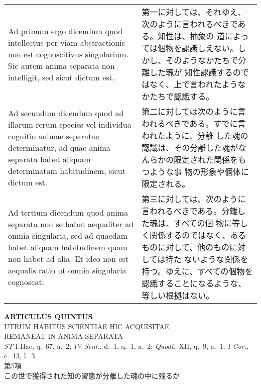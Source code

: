 \documentclass[10pt]{jsarticle} %
\begin{document}
\begin{longtable}{p{21em}p{21em}}
\\

{\sc Ad primum ergo dicendum} quod intellectus per viam abstractionis
non est cognoscitivus singularium. Sic autem anima separata non
intelligit, sed sicut dictum est.


&

第一に対しては、それゆえ、次のように言われるべきである。知性は、抽象の
道によっては個物を認識しえない。しかし、そのようなかたちで分離した魂が
知性認識するのではなく、上で言われたようなかたちで認識する。

\\


Ad secundum dicendum quod ad illarum rerum species vel individua
cognitio animae separatae determinatur, ad quae anima separata habet
aliquam determinatam habitudinem, sicut dictum est.

&

第二に対しては次のように言われるべきである。すでに言われたように、分離
した魂の認識は、その分離した魂がなんらかの限定された関係をもつような事
物の形象や個体に限定される。


\\



Ad tertium dicendum quod anima separata non se habet aequaliter ad
omnia singularia, sed ad quaedam habet aliquam habitudinem quam non
habet ad alia. Et ideo non est aequalis ratio ut omnia singularia
cognoscat.

&

第三に対しては、次のように言われるべきである。分離した魂は、すべての個
物に等しく関係するのではなく、あるものに対して、他のものに対しては持た
ないような関係を持つ。ゆえに、すべての個物を認識することになるような、
等しい根拠はない。





\end{longtable}

\newpage
{}

\begin{center}
{\Large {\bf ARTICULUS QUINTUS}}\\ {\large UTRUM HABITUS SCIENTIAE HIC
ACQUISITAE\\ REMANEAT IN ANIMA SEPARATA}\\ {\footnotesize {\it ST}
I-IIae, q.~67, a.~2; {\it IV Sent.}, d.~1, q.~1, a.~2; {\it
Quodl.}~XII, q.~9, a.~1; {\it I Cor.}, c.~13, l.~3.}\\ {\Large 第5項\\
この世で獲得された知の習態が分離した魂の中に残るか}
\end{center}
\end{document}
